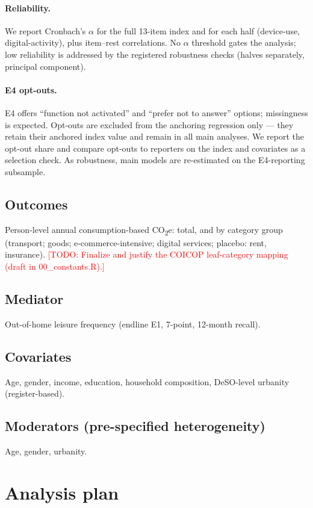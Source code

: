 \documentclass[11pt,a4paper]{article}
\newcommand{\todo}[1]{\textcolor{red}{[TODO: #1]}}
\begin{document}
\paragraph{Reliability.} We report Cronbach's $\alpha$ for the full 13-item
index and for each half (device-use, digital-activity), plus item--rest
correlations. No $\alpha$ threshold gates the analysis; low reliability is
addressed by the registered robustness checks (halves separately, principal
component).

\paragraph{E4 opt-outs.} E4 offers ``function not activated'' and ``prefer not
to answer'' options; missingness is expected. Opt-outs are excluded from the
anchoring regression only --- they retain their anchored index value and remain
in all main analyses. We report the opt-out share and compare opt-outs to
reporters on the index and covariates as a selection check. As robustness, main
models are re-estimated on the E4-reporting subsample.

\subsection{Outcomes}
Person-level annual consumption-based CO\textsubscript{2}e: total, and by
category group (transport; goods; e-commerce-intensive; digital services;
placebo: rent, insurance). \todo{Finalize and justify the COICOP leaf-category
mapping (draft in 00\_constants.R).}

\subsection{Mediator}
Out-of-home leisure frequency (endline E1, 7-point, 12-month recall).

\subsection{Covariates}
Age, gender, income, education, household composition, DeSO-level urbanity
(register-based).

\subsection{Moderators (pre-specified heterogeneity)}
Age, gender, urbanity.

\section{Analysis plan}
\end{document}
